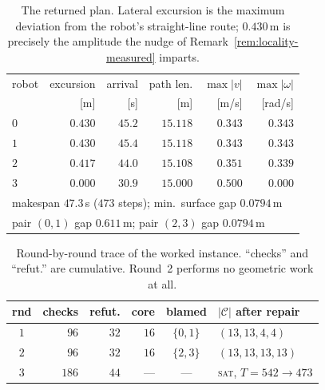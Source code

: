 \documentclass[conference]{IEEEtran}
\newcommand{\Cand}{\mathcal{C}}
\begin{document}
\begin{table}[t]
\caption{The returned plan. Lateral excursion is the maximum deviation from the robot's
straight-line route; $0.430$\,m is precisely the amplitude the nudge of
Remark~\ref{rem:locality-measured} imparts.}
\label{tab:result}
\centering
\small
\begin{tabular}{lrrrrr}
\toprule
robot & excursion & arrival & path len. & $\max|v|$ & $\max|\omega|$ \\
      & [m] & [s] & [m] & [m/s] & [rad/s] \\
\midrule
$0$ & $0.430$ & $45.2$ & $15.118$ & $0.343$ & $0.343$ \\
$1$ & $0.430$ & $45.4$ & $15.118$ & $0.343$ & $0.343$ \\
$2$ & $0.417$ & $44.0$ & $15.108$ & $0.351$ & $0.339$ \\
$3$ & $0.000$ & $30.9$ & $15.000$ & $0.500$ & $0.000$ \\
\midrule
\multicolumn{6}{l}{makespan $47.3$\,s ($473$ steps); min.\ surface gap $0.0794$\,m}\\
\multicolumn{6}{l}{pair $(0,1)$ gap $0.611$\,m; pair $(2,3)$ gap $0.0794$\,m}\\
\bottomrule
\end{tabular}
\end{table}

\begin{table}[t]
\caption{Round-by-round trace of the worked instance. ``checks'' and ``refut.'' are
cumulative. Round~2 performs no geometric work at all.}
\label{tab:rounds}
\centering
\small
\setlength{\tabcolsep}{4pt}
\begin{tabular}{crrrcl}
\toprule
rnd & checks & refut. & core & blamed & $|\Cand|$ after repair \\
\midrule
$1$ & $96$  & $32$ & $16$ & $\{0,1\}$ & $(13,13,4,4)$ \\
$2$ & $96$  & $32$ & $16$ & $\{2,3\}$ & $(13,13,13,13)$ \\
$3$ & $186$ & $44$ & --- & --- & \textsc{sat}, $T\!=\!542 \rightarrow 473$ \\
\bottomrule
\end{tabular}
\end{table}
\end{document}
